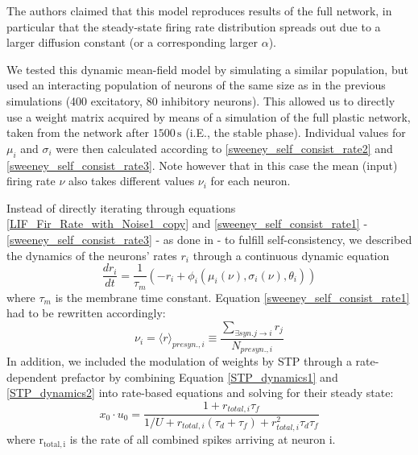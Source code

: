 \documentclass[10pt,a4paper]{article}
\begin{document}
The authors claimed that this model reproduces results of the full network, in particular that the steady-state firing rate distribution spreads out due to a larger diffusion constant (or a corresponding larger $\alpha$).

We tested this dynamic mean-field model by simulating a similar population, but used an interacting population of neurons of the same size as in the previous simulations (400 excitatory, 80 inhibitory neurons). This allowed us to directly use a weight matrix acquired by means of a simulation of the full plastic network, taken from the network after $\mathrm{1500 \, s}$ (i.E., the stable phase).
Individual values for $\mu_i$ and $\sigma_i$ were then calculated according to \eqref{sweeney_self_consist_rate2} and \eqref{sweeney_self_consist_rate3}. Note however that in this case the mean (input) firing rate $\nu$ also takes different values $\nu_i$ for each neuron.

Instead of directly iterating through equations \eqref{LIF_Fir_Rate_with_Noise1_copy} and \eqref{sweeney_self_consist_rate1} - \eqref{sweeney_self_consist_rate3} - as done in \cite{Sweeney_Paper} - to fulfill self-consistency, we described the dynamics of the neurons' rates $r_i$ through a continuous dynamic equation
\begin{equation}
\frac{dr_i}{dt} = \frac{1}{\tau_m} \left( -r_i + \phi_i(\mu_i(\nu),\sigma_i(\nu),\theta_i) \right)
\label{dyn_rate_equation}
\end{equation}
where $\tau_m$ is the membrane time constant. Equation \eqref{sweeney_self_consist_rate1} had to be rewritten accordingly:
\begin{equation}
\nu_i = {\langle r \rangle}_{presyn.,i} \equiv \frac{\sum_{\exists syn. j\rightarrow i} r_j}{N_{presyn., i}}
\label{sweeney_self_consist_rate1_mod}
\end{equation}
In addition, we included the modulation of weights by STP through a rate-dependent prefactor by combining Equation \eqref{STP_dynamics1} and \eqref{STP_dynamics2} into rate-based equations and solving for their steady state:
\begin{equation}
x_{0}\cdot u_{0} = \frac{1+r_{total,i} \tau_f}{1/U + r_{total,i} (\tau_d + \tau_f)+ r_{total,i}^2 \tau_d \tau_f}
\label{STP_steady}
\end{equation}
where $\mathrm{r_{total,i}}$ is the rate of all combined spikes arriving at neuron i.
\end{document}
